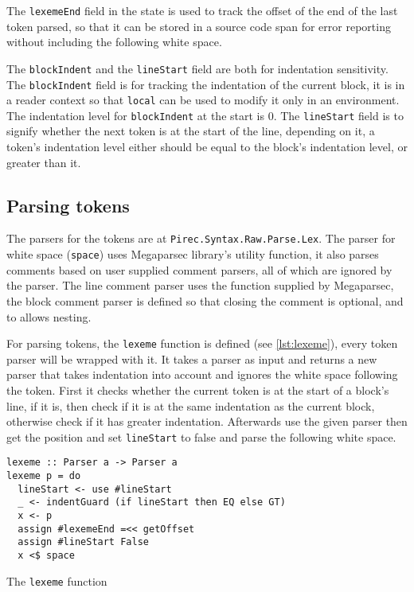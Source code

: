 The \texttt{lexemeEnd} field in the state is used to track the offset
of the end of the last token parsed, so that it can be stored in a source code
span for error reporting without including the following white space.

The \texttt{blockIndent} and the \texttt{lineStart} field
are both for indentation sensitivity. The \texttt{blockIndent} field
is for tracking the indentation of the current block, it is in a reader context
so that \texttt{local} can be used to modify it only in an
environment. The indentation level for \texttt{blockIndent} at the
start is 0. The \texttt{lineStart} field is to signify whether the
next token is at the start of the line, depending on it, a token's indentation
level either should be equal to the block's indentation level, or greater than
it.

\subsection{Parsing tokens}\label{ssec:parsing-tokens}

The parsers for the tokens are at \texttt{Pirec.Syntax.Raw.Parse.Lex}. The
parser for white space (\texttt{space}) uses Megaparsec library's
utility function, it also parses comments based on user supplied comment
parsers, all of which are ignored by the parser. The line comment parser uses
the function supplied by Megaparsec, the block comment parser is defined so that
closing the comment is optional, and to allows nesting.

For parsing tokens, the \texttt{lexeme} function is defined (see
\cref{lst:lexeme}), every token parser will be wrapped with it. It takes a
parser as input and returns a new parser that takes indentation into account and
ignores the white space following the token. First it checks whether the current
token is at the start of a block's line, if it is, then check if it is at the
same indentation as the current block, otherwise check if it has greater
indentation. Afterwards use the given parser then get the position and set
\texttt{lineStart} to false and parse the following white space.

\begin{listing}
  \begin{verbatim}
lexeme :: Parser a -> Parser a
lexeme p = do
  lineStart <- use #lineStart
  _ <- indentGuard (if lineStart then EQ else GT)
  x <- p
  assign #lexemeEnd =<< getOffset
  assign #lineStart False
  x <$ space
  \end{verbatim}
  \caption{The \texttt{lexeme} function}\label{lst:lexeme}
\end{listing}

